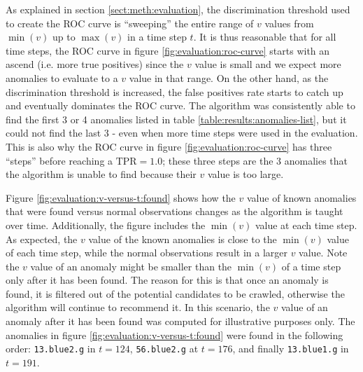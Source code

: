 As explained in section \ref{sect:meth:evaluation}, the discrimination threshold used to create the ROC curve is ``sweeping'' the entire range of $v$ values from $\min(v)$ up to $\max(v)$ in a time step $t$. It is thus reasonable that for all time steps, the ROC curve in figure \ref{fig:evaluation:roc-curve} starts with an ascend (i.e. more true positives) since the $v$ value is small and we expect more anomalies to evaluate to a $v$ value in that range. On the other hand, as the discrimination threshold is increased, the false positives rate starts to catch up and eventually dominates the ROC curve. The \mlblink algorithm was consistently able to find the first 3 or 4 anomalies listed in table \ref{table:results:anomalies-list}, but it could not find the last 3 - even when more time steps were used in the evaluation. This is also why the ROC curve in figure \ref{fig:evaluation:roc-curve} has three ``steps'' before reaching a $\text{TPR} = 1.0$; these three steps are the 3 anomalies that the \mlblink algorithm is unable to find because their $v$ value is too large. \newline

Figure \ref{fig:evaluation:v-versus-t:found} shows how the $v$ value of known anomalies that were found versus normal observations changes as the \mlblink algorithm is taught over time. Additionally, the figure includes the $\min(v)$ value at each time step. As expected, the $v$ value of the known anomalies is close to the $\min(v)$ value of each time step, while the normal observations result in a larger $v$ value. Note the $v$ value of an anomaly might be smaller than the $\min(v)$ of a time step only after it has been found. The reason for this is that once an anomaly is found, it is filtered out of the potential candidates to be crawled, otherwise the \mlblink algorithm will continue to recommend it. In this scenario, the $v$ value of an anomaly after it has been found was computed for illustrative purposes only. The anomalies in figure \ref{fig:evaluation:v-versus-t:found} were found in the following order: \texttt{13.blue2.g} in $t = 124$, \texttt{56.blue2.g} at $t = 176$, and finally \texttt{13.blue1.g} in $t = 191$. \newline

